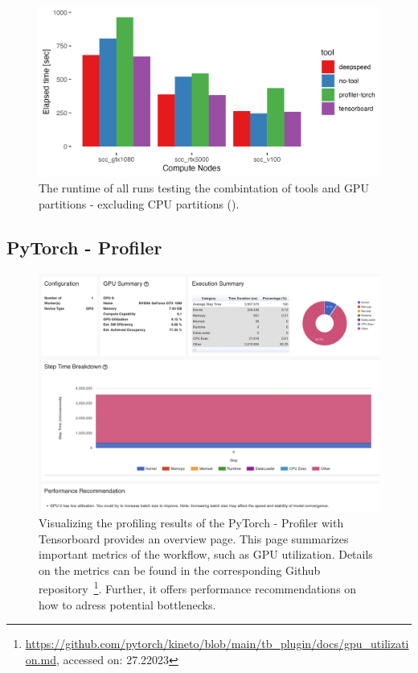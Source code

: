 \documentclass[12pt, a4paper, hidelinks]{article}
\begin{document}
\begin{figure}[H]
\centering
\includegraphics[width=1\textwidth]{./assets/sacct_barplot_by_nodes_no-experiment_gpu}
\caption[Runtime of the experiments (GPU-only)]{The runtime of all runs testing the combintation of tools and \ac{GPU} partitions - excluding \ac{CPU} partitions ().}
\label{fig:sacct_barplot_by_nodes_no-experiment_gpu}
\end{figure}

\subsection{PyTorch - Profiler}
\label{sec:r-pytorch-profiler}

\begin{figure}[H]
\centering
\includegraphics[width=1\textwidth]{./assets/scap_gtx1080_profiler-torch_14650076}
\caption[PyTorch - Profiler: Overview]{Visualizing the profiling results of the PyTorch - Profiler with Tensorboard provides an overview page. This page summarizes important metrics of the workflow, such as \ac{GPU} utilization. Details on the metrics can be found in the corresponding Github repository~\footnote{\url{https://github.com/pytorch/kineto/blob/main/tb_plugin/docs/gpu_utilization.md}, accessed on: 27.22023}. Further, it offers performance recommendations on how to adress potential bottlenecks. }
\label{fig:scap_gtx1080_profiler-torch_14650076}
\end{figure}
\end{document}
